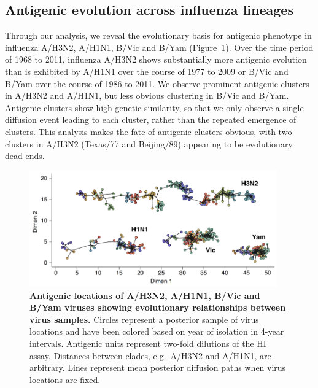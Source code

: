 \documentclass[11pt,oneside,letterpaper]{article}
\begin{document}
\subsection*{Antigenic evolution across influenza lineages}

Through our analysis, we reveal the evolutionary basis for antigenic phenotype in influenza A/H3N2, A/H1N1, B/Vic and B/Yam (Figure~\ref{map}).
Over the time period of 1968 to 2011, influenza A/H3N2 shows substantially more antigenic evolution than is exhibited by A/H1N1 over the course of 1977 to 2009 or B/Vic and B/Yam over the course of 1986 to 2011.
We observe prominent antigenic clusters in A/H3N2 and A/H1N1, but less obvious clustering in B/Vic and B/Yam.
Antigenic clusters show high genetic similarity, so that we only observe a single diffusion event leading to each cluster, rather than the repeated emergence of clusters.
This analysis makes the fate of antigenic clusters obvious, with two clusters in A/H3N2 (Texas/77 and Beijing/89) appearing to be evolutionary dead-ends.

\begin{figure}[h]
	\centering		
	\includegraphics[width=0.95\textwidth]{figures/map}
	\caption{\textbf{Antigenic locations of A/H3N2, A/H1N1, B/Vic and B/Yam viruses showing evolutionary relationships between virus samples.} 
	Circles represent a posterior sample of virus locations and have been colored based on year of isolation in 4-year intervals.
	Antigenic units represent two-fold dilutions of the HI assay.
	Distances between clades, e.g.\ A/H3N2 and A/H1N1, are arbitrary.
	Lines represent mean posterior diffusion paths when virus locations are fixed.} 
	\label{map} 
\end{figure}
\end{document}
